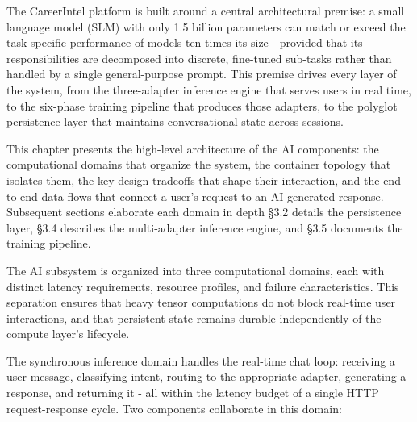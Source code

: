 \documentclass[12pt, a4paper]{report}
\begin{document}
\vspace{0.4cm}

\setlength{\parindent}{0.7cm}
\setlength{\parskip}{0.1cm}

The CareerIntel platform is built around a central architectural premise: a small language model (SLM) with only 1.5 billion parameters can match or exceed the task-specific performance of models ten times its size - provided that its responsibilities are decomposed into discrete, fine-tuned sub-tasks rather than handled by a single general-purpose prompt. This premise drives every layer of the system, from the three-adapter inference engine that serves users in real time, to the six-phase training pipeline that produces those adapters, to the polyglot persistence layer that maintains conversational state across sessions.

This chapter presents the high-level architecture of the AI components: the computational domains that organize the system, the container topology that isolates them, the key design tradeoffs that shape their interaction, and the end-to-end data flows that connect a user's request to an AI-generated response. Subsequent sections elaborate each domain in depth \textemdash{} \S3.2 details the persistence layer, \S3.4 describes the multi-adapter inference engine, and \S3.5 documents the training pipeline.

\vspace{0.6cm}
\vspace{0.4cm}

The AI subsystem is organized into three computational domains, each with distinct latency requirements, resource profiles, and failure characteristics. This separation ensures that heavy tensor computations do not block real-time user interactions, and that persistent state remains durable independently of the compute layer's lifecycle.

\vspace{0.4cm}
\vspace{0.3cm}

The synchronous inference domain handles the real-time chat loop: receiving a user message, classifying intent, routing to the appropriate adapter, generating a response, and returning it - all within the latency budget of a single HTTP request-response cycle. Two components collaborate in this domain:
\end{document}
